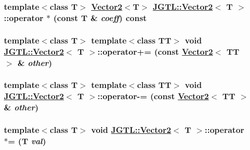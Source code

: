\hypertarget{class_j_g_t_l_1_1_vector2_5eed9682c853d7b3770bd2f242a44692}{
\subsubsection[operator $\ast$]{\setlength{\rightskip}{0pt plus 5cm}template$<$class T$>$ \hyperlink{class_j_g_t_l_1_1_vector2}{Vector2}$<$T$>$ \hyperlink{class_j_g_t_l_1_1_vector2}{JGTL::Vector2}$<$ T $>$::operator $\ast$ (const T \& {\em coeff}) const}}
\label{class_j_g_t_l_1_1_vector2_5eed9682c853d7b3770bd2f242a44692}


\hypertarget{class_j_g_t_l_1_1_vector2_694ca020b236266ce8e2f1cdb5717b8f}{
\subsubsection[operator+=]{\setlength{\rightskip}{0pt plus 5cm}template$<$class T$>$ template$<$class TT$>$ void \hyperlink{class_j_g_t_l_1_1_vector2}{JGTL::Vector2}$<$ T $>$::operator+= (const \hyperlink{class_j_g_t_l_1_1_vector2}{Vector2}$<$ TT $>$ \& {\em other})}}
\label{class_j_g_t_l_1_1_vector2_694ca020b236266ce8e2f1cdb5717b8f}


\hypertarget{class_j_g_t_l_1_1_vector2_2b228e4d945935697bfed2338c107647}{
\subsubsection[operator-=]{\setlength{\rightskip}{0pt plus 5cm}template$<$class T$>$ template$<$class TT$>$ void \hyperlink{class_j_g_t_l_1_1_vector2}{JGTL::Vector2}$<$ T $>$::operator-= (const \hyperlink{class_j_g_t_l_1_1_vector2}{Vector2}$<$ TT $>$ \& {\em other})}}
\label{class_j_g_t_l_1_1_vector2_2b228e4d945935697bfed2338c107647}


\hypertarget{class_j_g_t_l_1_1_vector2_67dbd8445f9f2a20b987fd0e9321d712}{
\subsubsection[operator $\ast$=]{\setlength{\rightskip}{0pt plus 5cm}template$<$class T$>$ void \hyperlink{class_j_g_t_l_1_1_vector2}{JGTL::Vector2}$<$ T $>$::operator $\ast$= (T {\em val})}}
\label{class_j_g_t_l_1_1_vector2_67dbd8445f9f2a20b987fd0e9321d712}


